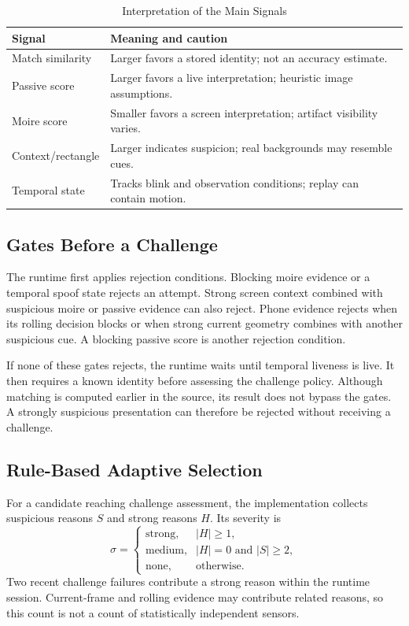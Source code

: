 \documentclass[conference,a4paper]{IEEEtran}
\begin{document}
\begin{table}[t]
\caption{Interpretation of the Main Signals}
\label{tab:signals}
\centering
\small
\begin{tabular}{@{}p{}p{}@{}}
\hline
Signal & Meaning and caution \\
\hline
Match similarity & Larger favors a stored identity; not an accuracy estimate. \\
Passive score & Larger favors a live interpretation; heuristic image assumptions. \\
Moire score & Smaller favors a screen interpretation; artifact visibility varies. \\
Context/rectangle & Larger indicates suspicion; real backgrounds may resemble cues. \\
Temporal state & Tracks blink and observation conditions; replay can contain motion. \\
\hline
\end{tabular}
\end{table}

\subsection{Gates Before a Challenge}
The runtime first applies rejection conditions. Blocking moire evidence or a temporal spoof state rejects an attempt. Strong screen context combined with suspicious moire or passive evidence can also reject. Phone evidence rejects when its rolling decision blocks or when strong current geometry combines with another suspicious cue. A blocking passive score is another rejection condition.

If none of these gates rejects, the runtime waits until temporal liveness is live. It then requires a known identity before assessing the challenge policy. Although matching is computed earlier in the source, its result does not bypass the gates. A strongly suspicious presentation can therefore be rejected without receiving a challenge.

\subsection{Rule-Based Adaptive Selection}
For a candidate reaching challenge assessment, the implementation collects suspicious reasons $S$ and strong reasons $H$. Its severity is
\begin{equation}
\sigma=\begin{cases}
\text{strong},& |H|\geq1,\\
\text{medium},& |H|=0\text{ and }|S|\geq2,\\
\text{none},& \text{otherwise}.
\end{cases}
\end{equation}
Two recent challenge failures contribute a strong reason within the runtime session. Current-frame and rolling evidence may contribute related reasons, so this count is not a count of statistically independent sensors.
\end{document}
